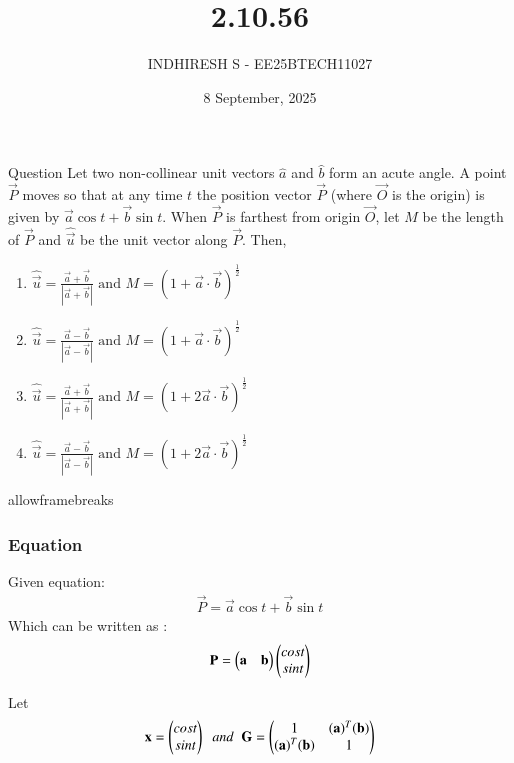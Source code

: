 \documentclass{beamer}
\title %
{2.10.56}
\date{8 September, 2025}
\author %
{INDHIRESH S - EE25BTECH11027}
\begin{document}
\frame{\titlepage}
\begin{frame}{Question}
Let two non-collinear unit vectors $\hat{a}$ and $\hat{b}$ form an acute angle. A point $\vec{P}$ moves so that at any time $t$ the position vector $\Vec{P}$ (where $\vec{O}$ is the origin) is given by $\Vec{a}\cos{t} + \vec{b}\sin{t}$. When $\vec{P}$ is farthest from origin $\vec{O}$, let $M$ be the length of $\Vec{P}$ and $\hat{\vec{u}}$ be the unit vector along $\Vec{P}$. Then,

    \begin{enumerate}
	    \item $\hat{\vec{u}} = \frac{\Vec{a}+\vec{b}}{|\Vec{a}+\vec{b}|} \text{ and } M = (1+\Vec{a} \cdot \vec{b})^{\frac{1}{2}}$
    	\item $\hat{\vec{u}} = \frac{\Vec{a}-\vec{b}}{|\Vec{a}-\vec{b}|} \text{ and } M = (1+\Vec{a} \cdot \vec{b})^{\frac{1}{2}}$
    	\item $\hat{\vec{u}} = \frac{\Vec{a}+\vec{b}}{|\Vec{a}+\vec{b}|} \text{ and } M = (1+2\Vec{a} \cdot \vec{b})^{\frac{1}{2}}$
    	\item $\hat{\vec{u}} = \frac{\Vec{a}-\vec{b}}{|\Vec{a}-\vec{b}|} \text{ and } M = (1+2\Vec{a} \cdot \vec{b})^{\frac{1}{2}}$
    \end{enumerate}
    
\end{frame}
\begin{frame}{allowframebreaks}
\frametitle{Equation}

    \centering
    
    \label{tab:parameters}
Given equation:
\begin{align}
     \Vec{P}=\vec{a}\cos{t} + \vec{b}\sin{t}
\end{align}
Which can be written as :
\begin{align}
    \Vec{P}=\myvec{\vec{a}&\vec{b}}\myvec{cost\\sint}
\end{align}

Let
\begin{align}
    \Vec{x}= \myvec{cost \\ sint} \;\;and\;\;\vec{G}=\myvec{1&(\Vec{a})^T(\Vec{b})\\(\Vec{a})^T(\Vec{b})&1}
\end{align}
   
\end{frame}
\end{document}
